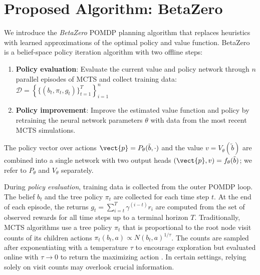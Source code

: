 \section{Proposed Algorithm: BetaZero}\label{sec:betazero}

We introduce the \textit{BetaZero} POMDP planning algorithm that replaces heuristics with learned approximations of the optimal policy and value function.
BetaZero is a belief-space policy iteration algorithm with two offline steps:
\begin{enumerate}
    \item \textbf{Policy evaluation}: Evaluate the current value and policy network through $n$ parallel episodes of MCTS and collect training data: $\mathcal{D} = \left\{\{(b_t, \pi_t, g_t)\}_{t=1}^T\right\}_{i=1}^n$
    \item \textbf{Policy improvement}: Improve the estimated value function and policy by retraining the neural network parameters $\theta$ with data from the most recent MCTS simulations.
\end{enumerate}
The policy vector over actions $\vect{p} = P_\theta(\tilde{b}, \cdot)$ and the value $v = V_\theta(\tilde{b})$ are combined into a single network with two output heads $(\vect{p}, v) = f_\theta(\tilde{b})$; we refer to $P_\theta$ and $V_\theta$ separately.

During \textit{policy evaluation}, training data is collected from the outer POMDP loop.
The belief $b_t$ and the tree policy $\pi_t$ are collected for each time step $t$.
At the end of each episode, the returns
$g_t = \sum_{i=t}^T \gamma^{(i-t)} r_i$
are computed from the set of observed rewards for all time steps up to a terminal horizon $T$.
Traditionally, MCTS algorithms use a tree policy $\pi_t$ that is proportional to the root node visit counts of its children actions
\(
    \pi_t(b_t, a) \propto N(b_t,a)^{1/\tau}\label{eq:policy_counts}
\).
The counts are sampled after exponentiating with a temperature $\tau$ to encourage exploration but evaluated online with $\tau \to 0$ to return the maximizing action \cite{silver2017mastering}.
In certain settings, relying solely on visit counts may overlook crucial information.


